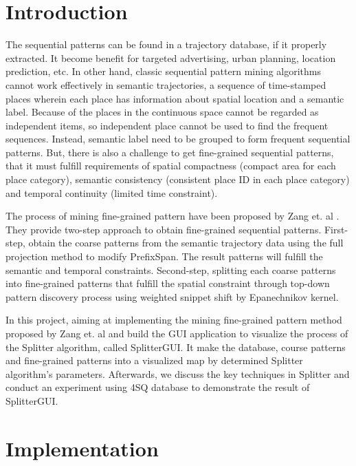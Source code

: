 \documentclass[conference]{IEEEtran}
\begin{document}
\section{Introduction}
The sequential patterns can be found in a trajectory database, if it properly extracted. It become benefit for targeted advertising, urban planning, location prediction, etc. In other hand, classic sequential pattern mining algorithms cannot work effectively in semantic trajectories, a sequence of time-stamped places wherein each place has information about spatial location and a semantic label. Because of the places in the continuous space cannot be regarded as independent items, so independent place cannot be used to find the frequent sequences. Instead, semantic label need to be grouped to form frequent sequential patterns. But, there is also a challenge to get fine-grained sequential patterns, that it must fulfill requirements of spatial compactness (compact area for each place category), semantic consistency (consistent place ID in each place category) and temporal continuity (limited time constraint).
\par
The process of mining fine-grained pattern have been proposed by Zang et. al \cite{zhang2014splitter}. They provide two-step approach to obtain fine-grained sequential patterns. First-step, obtain the coarse patterns from the semantic trajectory data using the full projection method to modify PrefixSpan. The result patterns will fulfill the semantic and temporal constraints. Second-step, splitting each coarse patterns into fine-grained patterns that fulfill the spatial constraint through top-down pattern discovery process using weighted snippet shift by Epanechnikov kernel.
\par
In this project, aiming at implementing the mining fine-grained pattern method proposed by Zang et. al \cite{zhang2014splitter} and build the GUI application to visualize the process of the Splitter algorithm, called SplitterGUI. It make the database, course patterns and fine-grained patterns into a visualized map by determined Splitter algorithm's parameters. Afterwards, we discuss the key techniques in Splitter and conduct an experiment using 4SQ database to demonstrate the result of SplitterGUI.


\section{Implementation}
\end{document}
